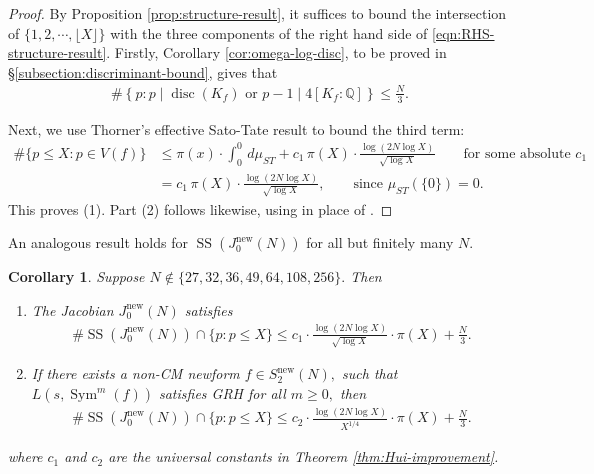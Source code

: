 \documentclass[11pt,letterpaper,reqno]{amsart}
\newtheorem{corollary}[theorem]{Corollary}
\theoremstyle{definition}
\numberwithin{equation}{section}
\numberwithin{figure}{section}
\numberwithin{table}{section}
\newcommand{\nw}{\mathrm{new}}
\begin{document}
\begin{proof}
    By Proposition \ref{prop:structure-result}, it suffices to bound the intersection of $\{1, 2, \cdots, \lfloor X \rfloor \}$ with the three components of the right hand side of \eqref{eqn:RHS-structure-result}. Firstly, Corollary \ref{cor:omega-log-disc}, to be proved in \S\ref{subsection:discriminant-bound}, gives that
    \begin{align}
        \#\left\{ p : p \mid \operatorname{disc}(K_f) \text{ or } p - 1 \mid 4[K_f : \mathbb{Q} ] \right\} \leq \frac{N}{3}.
    \end{align} 
    
    Next, we use Thorner's effective Sato-Tate result \cite[Theorem 1.1]{Thorner2021Effective} to bound the third term:
    \begin{align}
        \# \{p \leq X : p \in V(f)\} &\leq \pi(x) \cdot \int_{0}^0 \, d \mu_{ST} + c_1 \, \pi(X) \cdot \frac{\log (2N \log X)}{\sqrt{\log X}} \qquad \text{for some absolute $c_1$}\\
        &= c_1 \, \pi(X) \cdot \frac{\log (2N \log X)}{\sqrt{\log X}}, \qquad \text{since $\mu_{ST}(\{0\}) = 0.$}
    \end{align}
    This proves (1). Part (2) follows likewise, using \cite[Theorem 1.3]{Thorner2021Effective} in place of \cite[Theorem 1.1]{Thorner2021Effective}.
\end{proof}

An analogous result holds for $\operatorname{SS}(J_0^{\nw}(N))$ for all but finitely many $N.$

\begin{corollary}\label{cor:Hui-improvement-for-Jacobian}
    Suppose $N \notin \{ 27, 32, 36, 49, 64, 108, 256 \}.$ Then
    \begin{enumerate}
        \item The Jacobian $J_0^{\nw}(N)$ satisfies
    \begin{align}
        \#  \operatorname{SS}(J_0^{\nw}(N)) \cap \{p : p \leq X\} \leq c_1 \cdot \frac{\log (2N \log X)}{\sqrt{\log X}} \cdot \pi(X) + \frac{N}{3}.
    \end{align}
    \item If there exists a non-CM newform $f \in S_2^\nw(N),$ such that $L(s, \operatorname{Sym}^m (f))$ satisfies GRH for all $m \geq 0,$ then
    \begin{align}
        \#  \operatorname{SS}(J_0^{\nw}(N)) \cap \{p : p \leq X\} \leq c_2 \cdot \frac{\log (2N \log X)}{X^{1/4}} \cdot \pi(X) + \frac{N}{3}.
    \end{align}
    \end{enumerate}
    where $c_1$ and $c_2$ are the universal constants in Theorem \ref{thm:Hui-improvement}.
\end{corollary}
\end{document}

